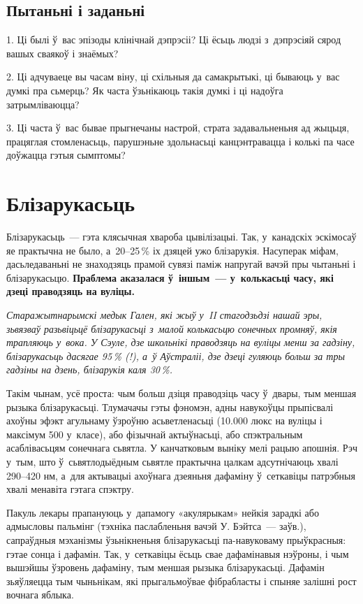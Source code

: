 \subsection*{Пытаньні і заданьні}

1. Ці былі ў~вас эпізоды клінічнай дэпрэсіі? Ці ёсьць людзі з~дэпрэсіяй сярод вашых сваякоў і знаёмых?

2. Ці адчуваеце вы часам віну, ці схільныя да самакрытыкі, ці бываюць у~вас думкі пра сьмерць? Як часта ўзьнікаюць такія думкі і ці надоўга затрымліваюцца?

3. Ці часта ў~вас бывае прыгнечаны настрой, страта задавальненьня ад жыцьця, працяглая стомленасьць, парушэньне здольнасьці канцэнтравацца і колькі па часе доўжацца гэтыя сымптомы?


\section{Блізарукасьць}

Блізарукасьць~--- гэта клясычная хвароба цывілізацыі. Так, у~канадскіх эскімосаў яе практычна не было, а~20--25\,\% іх дзяцей ужо блізарукія. Насуперак міфам, дасьледаваньні не знаходзяць прамой сувязі паміж напругай вачэй пры чытаньні і блізарукасьцю. \textbf{Праблема аказалася ў~іншым~--- у~колькасьці часу, які дзеці праводзяць на вуліцы.}

\emph{Старажытнарымскі медык Гален, які жыў у~II стагодзьдзі нашай эры, зьвязваў разьвіцьцё блізарукасьці з~малой колькасьцю сонечных промняў, якія трапляюць у~вока. У Сэуле, дзе школьнікі праводзяць на вуліцы менш за гадзіну, блізарукасьць дасягае 95\,\% (!), а~ў Аўстраліі, дзе дзеці гуляюць больш за тры гадзіны на дзень, блізарукія каля 30\,\%.}

Такім чынам, усё проста: чым больш дзіця праводзіць часу ў~двары, тым меншая рызыка блізарукасьці. Тлумачачы гэты фэномэн, адны навукоўцы прыпісвалі ахоўны эфэкт агульнаму ўзроўню асьветленасьці (10.000 люкс на вуліцы і максімум 500 у~класе), або фізычнай актыўнасьці, або спэктральным асаблівасьцям сонечнага сьвятла. У канчатковым выніку мелі рацыю апошнія. Рэч у~тым, што ў~сьвятлодыёдным сьвятле практычна цалкам адсутнічаюць хвалі 290--420 нм, а~для актывацыі ахоўнага дзеяньня дафаміну ў~сеткавіцы патрэбныя хвалі менавіта гэтага спэктру.

Пакуль лекары прапануюць у~дапамогу «акулярыкам» нейкія зарадкі або адмысловы пальмінг (тэхніка паслабленьня вачэй У. Бэйтса~--- заўв.), сапраўдныя мэханізмы ўзьнікненьня блізарукасьці па-навуковаму прыўкрасныя: гэтае сонца і дафамін. Так, у~сеткавіцы ёсьць свае дафамінавыя нэўроны, і чым вышэйшы ўзровень дафаміну, тым меншая рызыка блізарукасьці. Дафамін зьяўляецца тым чыньнікам, які прыгальмоўвае фібрабласты і спыняе залішні рост вочнага яблыка. 

